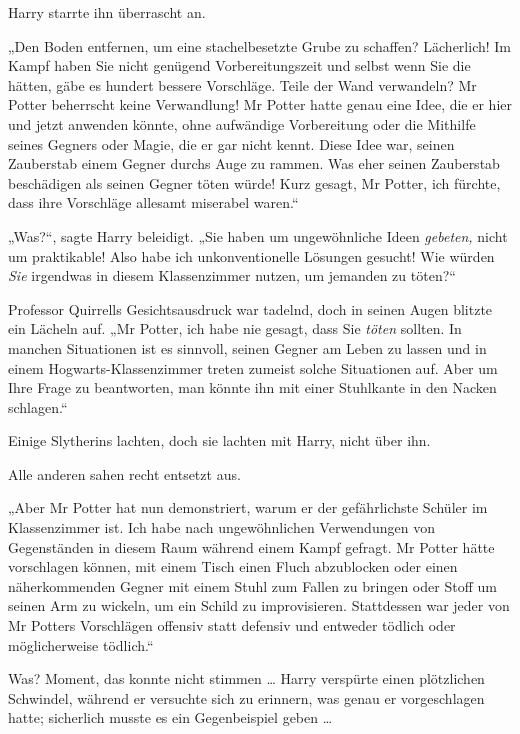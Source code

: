 {Harry starrte ihn überrascht an.

„Den Boden entfernen, um eine stachelbesetzte Grube zu schaffen? Lächerlich! Im Kampf haben Sie nicht genügend Vorbereitungszeit und selbst wenn Sie die hätten, gäbe es hundert bessere Vorschläge. Teile der Wand verwandeln? Mr Potter beherrscht keine Verwandlung! Mr Potter hatte genau eine Idee, die er hier und jetzt anwenden könnte, ohne aufwändige Vorbereitung oder die Mithilfe seines Gegners oder Magie, die er gar nicht kennt. Diese Idee war, seinen Zauberstab einem Gegner durchs Auge zu rammen. Was eher seinen Zauberstab beschädigen als seinen Gegner töten würde! Kurz gesagt, Mr Potter, ich fürchte, dass ihre Vorschläge allesamt miserabel waren.“

„Was?“, sagte Harry beleidigt. „Sie haben um ungewöhnliche Ideen \emph{gebeten,} nicht um praktikable! Also habe ich unkonventionelle Lösungen gesucht! Wie würden \emph{Sie} irgendwas in diesem Klassenzimmer nutzen, um jemanden zu töten?“

Professor Quirrells Gesichtsausdruck war tadelnd, doch in seinen Augen blitzte ein Lächeln auf. „Mr Potter, ich habe nie gesagt, dass Sie \emph{töten} sollten. In manchen Situationen ist es sinnvoll, seinen Gegner am Leben zu lassen und in einem Hogwarts-Klassenzimmer treten zumeist solche Situationen auf. Aber um Ihre Frage zu beantworten, man könnte ihn mit einer Stuhlkante in den Nacken schlagen.“

Einige Slytherins lachten, doch sie lachten mit Harry, nicht über ihn.

Alle anderen sahen recht entsetzt aus.

„Aber Mr Potter hat nun demonstriert, warum er der gefährlichste Schüler im Klassenzimmer ist. Ich habe nach ungewöhnlichen Verwendungen von Gegenständen in diesem Raum während einem Kampf gefragt. Mr Potter hätte vorschlagen können, mit einem Tisch einen Fluch abzublocken oder einen näherkommenden Gegner mit einem Stuhl zum Fallen zu bringen oder Stoff um seinen Arm zu wickeln, um ein Schild zu improvisieren. Stattdessen war jeder von Mr Potters Vorschlägen offensiv statt defensiv und entweder tödlich oder möglicherweise tödlich.“

Was? Moment, das konnte nicht stimmen … Harry verspürte einen plötzlichen Schwindel, während er versuchte sich zu erinnern, was genau er vorgeschlagen hatte; sicherlich musste es ein Gegenbeispiel geben …

}
